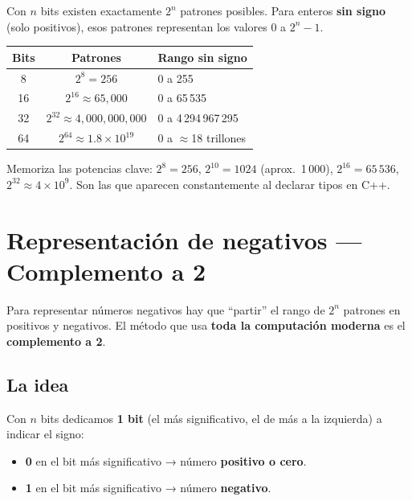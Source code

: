 \documentclass[12pt, oneside]{article}
\begin{document}
Con $n$ bits existen exactamente $2^n$ patrones posibles.
Para enteros \textbf{sin signo} (solo positivos), esos patrones representan
los valores $0$ a $2^n - 1$.

\begin{center}
\begin{tabular}{ccl}
  \toprule
  \textbf{Bits} & \textbf{Patrones} & \textbf{Rango sin signo} \\
  \midrule
   8 & $2^8  = 256$                   & 0 a 255 \\
  16 & $2^{16} \approx 65{,}000$      & 0 a 65\,535 \\
  32 & $2^{32} \approx 4{,}000{,}000{,}000$ & 0 a 4\,294\,967\,295 \\
  64 & $2^{64} \approx 1.8\times10^{19}$ & 0 a $\approx$18 trillones \\
  \bottomrule
\end{tabular}
\end{center}

\begin{consejo}
  Memoriza las potencias clave: $2^8=256$, $2^{10}=1024$ (aprox.\ 1\,000),
  $2^{16}=65\,536$, $2^{32}\approx4\times10^9$. Son las que aparecen
  constantemente al declarar tipos en C++.
\end{consejo}

\section{Representación de negativos — Complemento a 2}

Para representar números negativos hay que ``partir'' el rango de $2^n$
patrones en positivos y negativos. El método que usa \textbf{toda la
computación moderna} es el \textbf{complemento a 2}.

\subsection{La idea}

Con $n$ bits dedicamos \textbf{1 bit} (el más significativo, el de más a
la izquierda) a indicar el signo:
\begin{itemize}
  \item \textbf{0} en el bit más significativo → número \textbf{positivo o cero}.
  \item \textbf{1} en el bit más significativo → número \textbf{negativo}.
\end{itemize}
\end{document}
